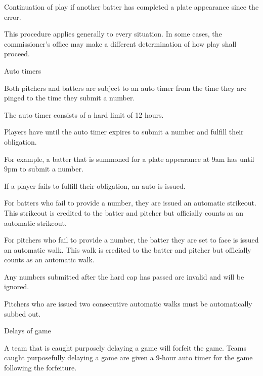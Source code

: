 \begin{deepEnumerate}
\begin{deepEnumerate}
\begin{deepEnumerate}
\begin{deepEnumerate}
				\item Continuation of play if another batter has completed a plate appearance since the error.
				\item This procedure applies generally to every situation. 
				In some cases, the commissioner’s office may make a different determination of how play shall proceed.
			\end{deepEnumerate}
		\end{deepEnumerate}
	\end{deepEnumerate}
	\item Auto timers
	\begin{deepEnumerate}
		\item Both pitchers and batters are subject to an auto timer from the time they are pinged to the time they submit a number.
		\item The auto timer consists of a hard limit of 12 hours.
		\item Players have until the auto timer expires to submit a number and fulfill their obligation.
		\begin{deepEnumerate}
			\item For example, a batter that is summoned for a plate appearance at 9am has until 9pm to submit a number.
		\end{deepEnumerate}
		\item If a player fails to fulfill their obligation, an auto is issued.
		\begin{deepEnumerate}
			\item For batters who fail to provide a number, they are issued an automatic strikeout. 
			This strikeout is credited to the batter and pitcher but officially counts as an automatic strikeout.
			\item For pitchers who fail to provide a number, the batter they are set to face is issued an automatic walk. 
			This walk is credited to the batter and pitcher but officially counts as an automatic walk.
			\item Any numbers submitted after the hard cap has passed are invalid and will be ignored.
		\end{deepEnumerate}
		\item Pitchers who are issued two consecutive automatic walks must be automatically subbed out.
		\item Delays of game
		\begin{deepEnumerate}
			\item A team that is caught purposely delaying a game will forfeit the game. 
			Teams caught purposefully delaying a game are given a 9-hour auto timer for the game following the forfeiture.

\end{deepEnumerate}
\end{deepEnumerate}
\end{deepEnumerate}
